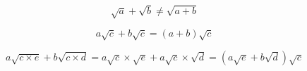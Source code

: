 \documentclass{article}
\begin{document}
\begin{equation}
	\label{bad_add}
	\sqrt{a} + \sqrt{b} \ne \sqrt{a + b}
\end{equation}

\begin{equation}
	\label{simple_surd_add}
	a\sqrt{c} + b\sqrt{c} = (a + b)\sqrt{c}
\end{equation}

\begin{equation}
	\label{surd_add}
	a\sqrt{c \times e} + b\sqrt{c \times d} = a\sqrt{c} \times \sqrt{e} + a\sqrt{c} \times \sqrt{d}
	 = (a\sqrt{e} + b\sqrt{d})\sqrt{c}
\end{equation}
\end{document}
